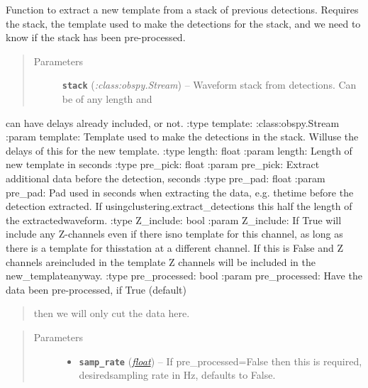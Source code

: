 \documentclass[a4paper,10pt,english]{sphinxmanual}
\begin{document}
\begin{fulllineitems}
\label{submodules/core.template_gen:template_gen.extract_from_stack}
Function to extract a new template from a stack of previous detections.
Requires the stack, the template used to make the detections for the stack,
and we need to know if the stack has been pre-processed.
\begin{quote}\begin{description}
\item[{Parameters}] \leavevmode
\textbf{\texttt{stack}} (\emph{:class:obspy.Stream}) -- Waveform stack from detections.  Can be of any length and

\end{description}\end{quote}

can have delays already included, or not.
:type template: :class:obspy.Stream
:param template: Template used to make the detections in the stack. Willuse the delays of this for the new template.
:type length: float
:param length: Length of new template in seconds
:type pre\_pick: float
:param pre\_pick: Extract additional data before the detection, seconds
:type pre\_pad: float
:param pre\_pad: Pad used in seconds when extracting the data, e.g. thetime before the detection extracted.  If usingclustering.extract\_detections this half the length of the extractedwaveform.
:type Z\_include: bool
:param Z\_include: If True will include any Z-channels even if there isno template for this channel, as long as there is a template for thisstation at a different channel.  If this is False and Z channels areincluded in the template Z channels will be included in the new\_templateanyway.
:type pre\_processed: bool
:param pre\_processed: Have the data been pre-processed, if True (default)
\begin{quote}

then we will only cut the data here.
\end{quote}
\begin{quote}\begin{description}
\item[{Parameters}] \leavevmode\begin{itemize}
\item {} 
\textbf{\texttt{samp\_rate}} (\href{https://docs.python.org/library/functions.html\#float}{\emph{float}}) -- If pre\_processed=False then this is required, desiredsampling rate in Hz, defaults to False.


\end{itemize}
\end{description}
\end{quote}
\end{fulllineitems}
\end{document}
